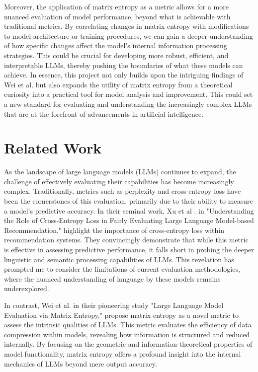 \documentclass{article}
\begin{document}
Moreover, the application of matrix entropy as a metric allows for a more nuanced evaluation of model performance, beyond what is achievable with traditional metrics. By correlating changes in matrix entropy with modifications to model architecture or training procedures, we can gain a deeper understanding of how specific changes affect the model's internal information processing strategies. This could be crucial for developing more robust, efficient, and interpretable LLMs, thereby pushing the boundaries of what these models can achieve. In essence, this project not only builds upon the intriguing findings of Wei et al. but also expands the utility of matrix entropy from a theoretical curiosity into a practical tool for model analysis and improvement. This could set a new standard for evaluating and understanding the increasingly complex LLMs that are at the forefront of advancements in artificial intelligence.

\section{Related Work}
\label{gen_inst}

As the landscape of large language models (LLMs) continues to expand, the challenge of effectively evaluating their capabilities has become increasingly complex. Traditionally, metrics such as perplexity and cross-entropy loss have been the cornerstones of this evaluation, primarily due to their ability to measure a model's predictive accuracy. In their seminal work, Xu et al \cite{xu2024}. in "Understanding the Role of Cross-Entropy Loss in Fairly Evaluating Large Language Model-based Recommendation," highlight the importance of cross-entropy loss within recommendation systems. They convincingly demonstrate that while this metric is effective in assessing predictive performance, it falls short in probing the deeper linguistic and semantic processing capabilities of LLMs. This revelation has prompted me to consider the limitations of current evaluation methodologies, where the nuanced understanding of language by these models remains underexplored.

In contrast, Wei et al. in their pioneering study "Large Language Model Evaluation via Matrix Entropy," propose matrix entropy as a novel metric to assess the intrinsic qualities of LLMs. This metric evaluates the efficiency of data compression within models, revealing how information is structured and reduced internally. By focusing on the geometric and information-theoretical properties of model functionality, matrix entropy offers a profound insight into the internal mechanics of LLMs beyond mere output accuracy.
\end{document}
